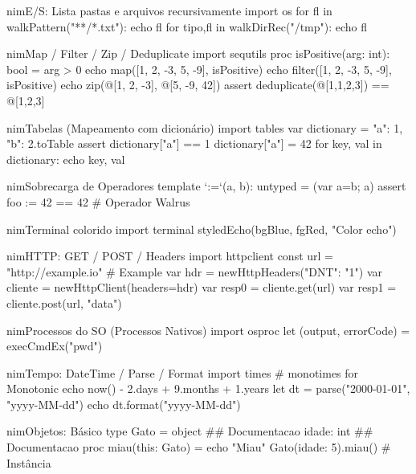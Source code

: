 \documentclass[10pt, a4paper]{article}
\begin{document}
\begin{multicols}{4}
\begin{codebox}{nim}{E/S: Lista pastas e arquivos recursivamente}
import os
for fl in walkPattern("**/*.txt"): echo fl
for tipo,fl in walkDirRec("/tmp"): echo fl
\end{codebox}


\begin{codebox}{nim}{Map / Filter / Zip / Deduplicate}
import sequtils
proc isPositive(arg: int): bool = arg > 0
echo map([1, 2, -3, 5, -9], isPositive)
echo filter([1, 2, -3, 5, -9], isPositive)
echo zip(@[1, 2, -3], @[5, -9, 42])
assert deduplicate(@[1,1,2,3]) == @[1,2,3]
\end{codebox}


\begin{codebox}{nim}{Tabelas (Mapeamento com dicionário)}
import tables
var dictionary = {"a": 1, "b": 2}.toTable
assert dictionary["a"] == 1
dictionary["a"] = 42
for key, val in dictionary: echo key, val
\end{codebox}


\begin{codebox}{nim}{Sobrecarga de Operadores}
template `:=`(a, b): untyped = (var a=b; a)
assert foo := 42 == 42  # Operador Walrus
\end{codebox}


\begin{codebox}{nim}{Terminal colorido}
import terminal
styledEcho(bgBlue, fgRed, "Color echo")
\end{codebox}


\begin{codebox}{nim}{HTTP: GET / POST / Headers}
import httpclient
const url = "http://example.io" # Example
var hdr = newHttpHeaders({"DNT": "1"})
var cliente = newHttpClient(headers=hdr)
var resp0 = cliente.get(url)
var resp1 = cliente.post(url, "data")
\end{codebox}


\begin{codebox}{nim}{Processos do SO (Processos Nativos)}
import osproc
let (output, errorCode) = execCmdEx("pwd")
\end{codebox}


\begin{codebox}{nim}{Tempo: DateTime / Parse / Format}
import times # monotimes for Monotonic
echo now() - 2.days + 9.months + 1.years
let dt = parse("2000-01-01", "yyyy-MM-dd")
echo dt.format("yyyy-MM-dd")
\end{codebox}


\begin{codebox}{nim}{Objetos: Básico}
  type Gato = object ## Documentacao
    idade: int ## Documentacao
  proc miau(this: Gato) = echo "Miau"
  Gato(idade: 5).miau() # Instância
\end{codebox}



\end{multicols}
\end{document}
